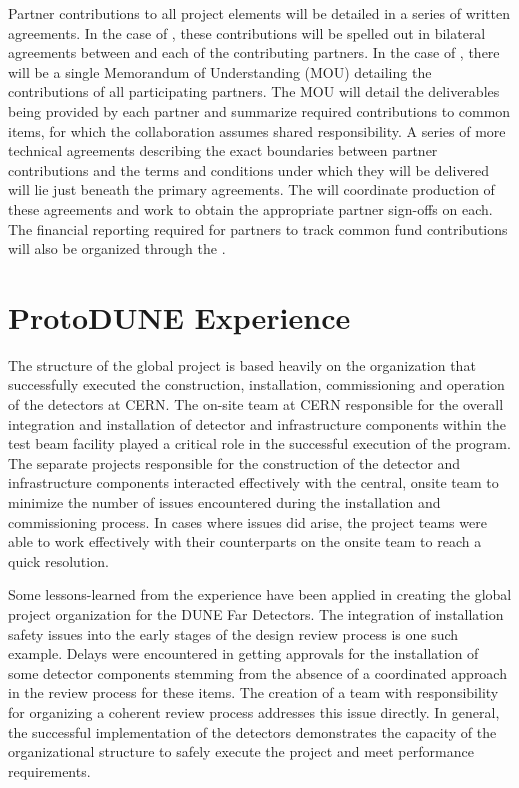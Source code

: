 Partner contributions to all project elements will be detailed in a
series of written agreements.  In the case of , these
contributions will be spelled out in bilateral agreements between
 and each of the contributing partners.  In the case of
, there will be a single Memorandum of Understanding (MOU)
detailing the contributions of all participating partners.  The MOU
will detail the deliverables being provided by each partner and
summarize required contributions to common items, for which the
collaboration assumes shared responsibility.  A series of more
technical agreements describing the exact boundaries between partner
contributions and the terms and conditions under which they will be
delivered will lie just beneath the primary agreements.  The
 will coordinate production of these agreements and work to
obtain the appropriate partner sign-offs on each.  The financial
reporting required for partners to track common fund contributions
will also be organized through the .

\section{ProtoDUNE Experience}
\label{sec:dune_protodune}

The structure of the global project is based heavily on the
organization that successfully executed the construction,
installation, commissioning and operation of the 
detectors at CERN.  The on-site team at CERN responsible for the
overall integration and installation of detector and infrastructure
components within the test beam facility played a critical role in the
successful execution of the  program.  The separate
projects responsible for the construction of the detector and
infrastructure components interacted effectively with the central,
onsite team to minimize the number of issues encountered during the
installation and commissioning process.  In cases where issues did
arise, the project teams were able to work effectively with their
counterparts on the onsite team to reach a quick resolution.

Some lessons-learned from the  experience have been
applied in creating the global project organization for the DUNE Far
Detectors.  The integration of installation safety issues into the
early stages of the design review process is one such example.  Delays
were encountered in getting approvals for the installation of some
 detector components stemming from the absence of a
coordinated approach in the review process for these items.  The
creation of a  team with responsibility for organizing a
coherent review process addresses this issue directly.  In general,
the successful implementation of the  detectors
demonstrates the capacity of the organizational structure to safely
execute the project and meet performance requirements.

